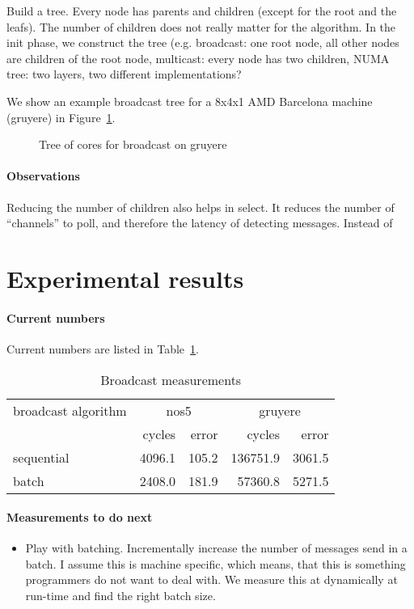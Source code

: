 \documentclass{article}
\begin{document}
Build a tree. Every node has parents and children (except for the root
and the leafs). The number of children does not really matter for the
algorithm. In the init phase, we construct the tree (e.g. broadcast:
one root node, all other nodes are children of the root node,
multicast: every node has two children, NUMA tree: two layers, two
different implementations?

We show an example broadcast tree for a 8x4x1 AMD Barcelona machine
(gruyere) in Figure~\ref{fig:qrm_tree_gruyere}.

\begin{figure}
  
  \caption{Tree of cores for broadcast on gruyere}
  \label{fig:qrm_tree_gruyere}
\end{figure}

\paragraph{Observations} Reducing the number of children also helps in
select. It reduces the number of ``channels'' to poll, and therefore
the latency of detecting messages. Instead of

\section{Experimental results}

\paragraph{Current numbers} Current numbers are listed in
Table~\ref{tab:bc_measurements}. 

\begin{table}[htb]
  \centering
  \begin{tabular}{lrrrr}
    \toprule
    broadcast algorithm & \multicolumn{2}{c}{nos5} & \multicolumn{2}{c}{gruyere} \\
      & cycles & error & cycles & error \\
    \midrule
    sequential &  4096.1 &  105.2 & 136751.9 &   3061.5 \\
    batch      &  2408.0 &  181.9 &  57360.8 &   5271.5 \\
    \bottomrule
  \end{tabular}
  \caption{Broadcast measurements}
  \label{tab:bc_measurements}
\end{table}

\paragraph{Measurements to do next} %
\begin{itemize}
\item Play with batching. Incrementally increase the number of
  messages send in a batch. I assume this is machine specific, which
  means, that this is something programmers do not want to deal
  with. We measure this at dynamically at run-time and find the right
  batch size.
\end{itemize}
\end{document}
